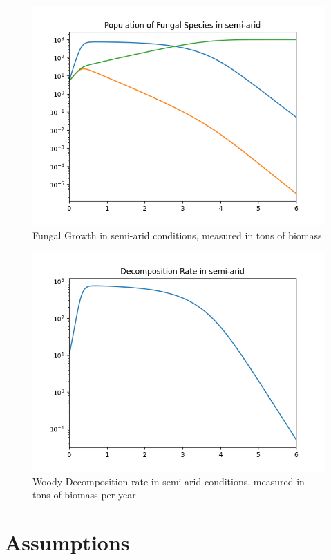 \documentclass[twocolumn]{article} %
\begin{document}
\begin{figure}[t]
	\includegraphics[width=\columnwidth]{figures/Figure_1_s.png}
      \caption{Fungal Growth in semi-arid conditions, measured in tons of biomass}
      \label{fig:f2}
\end{figure}
\begin{figure}[t]
	\includegraphics[width=\columnwidth]{figures/Figure_2_s.png}
      \caption{Woody Decomposition rate in semi-arid conditions, measured in tons of biomass per year}
      \label{fig:d2}
\end{figure}

\newpage
\section{Assumptions}
\end{document}
